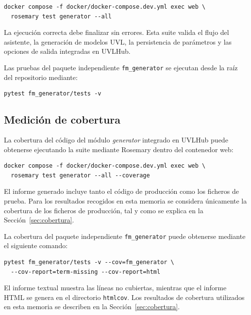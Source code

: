 \begin{verbatim}
docker compose -f docker/docker-compose.dev.yml exec web \
  rosemary test generator --all
\end{verbatim}

La ejecución correcta debe finalizar sin errores. Esta suite valida el flujo del
asistente, la generación de modelos UVL, la persistencia de parámetros y las
opciones de salida integradas en UVLHub.

Las pruebas del paquete independiente \texttt{fm\_generator} se ejecutan desde
la raíz del repositorio mediante:

\begin{verbatim}
pytest fm_generator/tests -v
\end{verbatim}

\subsection{Medición de cobertura}

La cobertura del código del módulo \textit{generator} integrado en UVLHub puede
obtenerse ejecutando la suite mediante Rosemary dentro del contenedor web:

\begin{verbatim}
docker compose -f docker/docker-compose.dev.yml exec web \
  rosemary test generator --all --coverage
\end{verbatim}

El informe generado incluye tanto el código de producción como los ficheros de
prueba. Para los resultados recogidos en esta memoria se considera únicamente
la cobertura de los ficheros de producción, tal y como se explica en la
Sección~\ref{sec:cobertura}.

La cobertura del paquete independiente \texttt{fm\_generator} puede obtenerse
mediante el siguiente comando:

\begin{verbatim}
pytest fm_generator/tests -v --cov=fm_generator \
  --cov-report=term-missing --cov-report=html
\end{verbatim}

El informe textual muestra las líneas no cubiertas, mientras que el informe HTML
se genera en el directorio \texttt{htmlcov}. Los resultados de cobertura
utilizados en esta memoria se describen en la
Sección~\ref{sec:cobertura}.